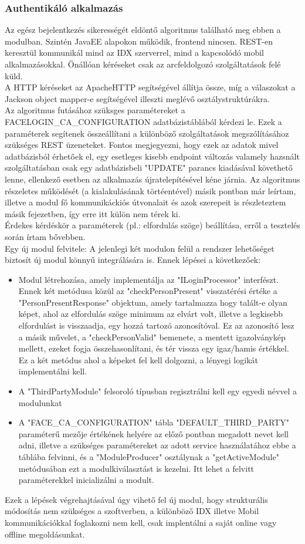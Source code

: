 \subsubsection{Authentikáló alkalmazás}
Az egész bejelentkezés sikerességét eldöntő algoritmus található meg ebben a modulban. Szintén JavaEE alapokon működik, frontend nincsen. REST-en keresztül kommunikál mind az IDX szerverrel, mind a kapcsolódó mobil alkalmazásokkal. Önállóan kéréseket csak az arcfeldolgozó szolgáltatások felé küld.
\\A HTTP kéréseket az ApacheHTTP segítségével állítja össze, míg a válaszokat a Jackson object mapper-e segítségével illeszti meglévő osztálystruktúrákra.
\\ Az algoritmus futásához szüksges paramétereket a FACELOGIN\_CA\_CONFIGURATION adatbázistáblából kérdezi le. Ezek a paraméterek segítenek összeállítani a különböző szolgáltatások megszólításához szükséges REST üzeneteket. Fontos megjegyezni, hogy ezek az adatok mivel adatbázisból érhetőek el, egy esetleges kisebb endpoint változás valamely hazsnált szolgáltatásban csak egy adatbázisbeli "UPDATE" parancs kiadásával követhető lenne, ellenkező esetben az alkalmazás újratelepítésével kéne járnia. Az algoritmus részeletes működését (a kialakulásának törtéentével) másik pontban már leírtam, illetve a modul fő kommunikáckiós útvonalait és azok szerepeit is részleteztem másik fejezetben, így erre itt külön nem térek ki.
\\Érdekes kérdéskör a paraméterek (pl.: elfordulás szöge) beállítása, erről a tesztelés során írtam bővebben.
\\Egy új modul felvitele:
A jelenlegi két modulon felül a rendszer lehetőséget biztosít új modul könnyű integrálására is. Ennek lépései a következőek:
\begin{itemize}
\item Modul létrehozása, amely implementálja az "ILoginProcessor" interfészt. Ennek két metódusa közül az "checkPersonPresent" visszatérési értéke a "PersonPresentResponse" objektum, amely tartalmazza hogy talált-e olyan képet, ahol az elfordulás szöge minimum az elvárt volt, illetve a legkisebb elfordulást is visszaadja, egy hozzá tartozó azonosítóval. Ez az azonosító lesz a másik művelet, a "checkPersonValid" bemenete, a mentett igazolványkép mellett, ezeket fogja összehasonlítani, és tér vissza egy igaz/hamis értékkel. Ez a két metódus ahol a képeket fel kell dolgozni, a lényegi logikát implementálni kell.
\item  A "ThirdPartyModule" felsoroló típusban regisztrálni kell egy egyedi névvel a modulunkat
\item A "FACE\_CA\_CONFIGURATION" tábla "DEFAULT\_THIRD\_PARTY" paraméterű mezője értékének helyére az előző pontban megadott nevet kell adni, illetve a szükséges paramétereket az adott service használatához ebbe a táblába felvinni, és a "ModuleProducer" osztálynak a "getActiveModule" metódusában ezt a modulkiválasztást is kezelni. Itt lehet a felvitt paraméterekkel inicializálni a modult.
\end{itemize}

Ezek a lépések végrehajtásával úgy vihető fel új modul, hogy strukturális módosítás nem szükséges a szoftverben, a különböző IDX illetve Mobil kommunikációkkal foglakozni nem kell, csak implentálni a saját online vagy offline megoldásunkat.